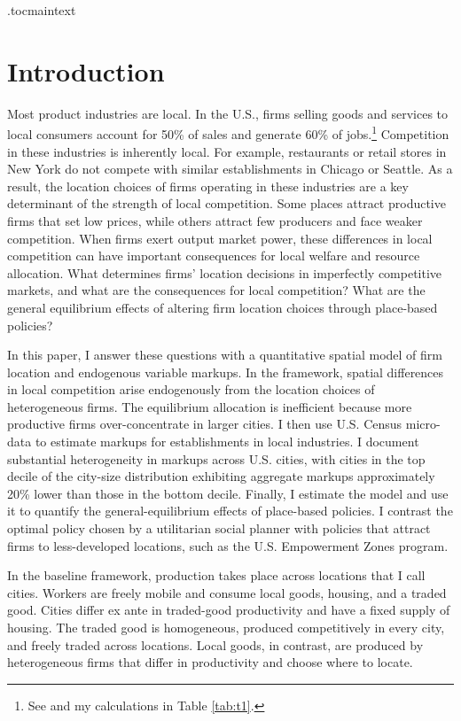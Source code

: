\clearpage
{}

\etocdepthtag.toc{maintext}
\section{Introduction}
Most product industries are local. In the U.S., firms selling goods and services to local consumers account for 50\% of sales and generate 60\% of jobs.\footnote{See \textcite{DelgadoPorter&Stern16} and my calculations in Table \ref{tab:t1}.} Competition in these industries is inherently local. For example, restaurants or retail stores in New York do not compete with similar establishments in Chicago or Seattle. As a result, the location choices of firms operating in these industries are a key determinant of the strength of local competition. Some places attract productive firms that set low prices, while others attract few producers and face weaker competition. When firms exert output market power, these differences in local competition can have important consequences for local welfare and resource allocation. What determines firms’ location decisions in imperfectly competitive markets, and what are the consequences for local competition? What are the general equilibrium effects of altering firm location choices through place-based policies?

In this paper, I answer these questions with a quantitative spatial model of firm location and endogenous variable markups. In the framework, spatial differences in local competition arise endogenously from the location choices of heterogeneous firms. The equilibrium allocation is inefficient because more productive firms over-concentrate in larger cities. I then use U.S. Census micro-data to estimate markups for establishments in local industries. I document substantial heterogeneity in markups across U.S. cities, with cities in the top decile of the city-size distribution exhibiting aggregate markups approximately 20\% lower than those in the bottom decile. Finally, I estimate the model and use it to quantify the general-equilibrium effects of place-based policies. I contrast the optimal policy chosen by a utilitarian social planner with policies that attract firms to less-developed locations, such as the U.S. Empowerment Zones program.

In the baseline framework, production takes place across locations that I call cities. Workers are freely mobile and consume local goods, housing, and a traded good. Cities differ ex ante in traded-good productivity and have a fixed supply of housing. The traded good is homogeneous, produced competitively in every city, and freely traded across locations. Local goods, in contrast, are produced by heterogeneous firms that differ in productivity and choose where to locate.

